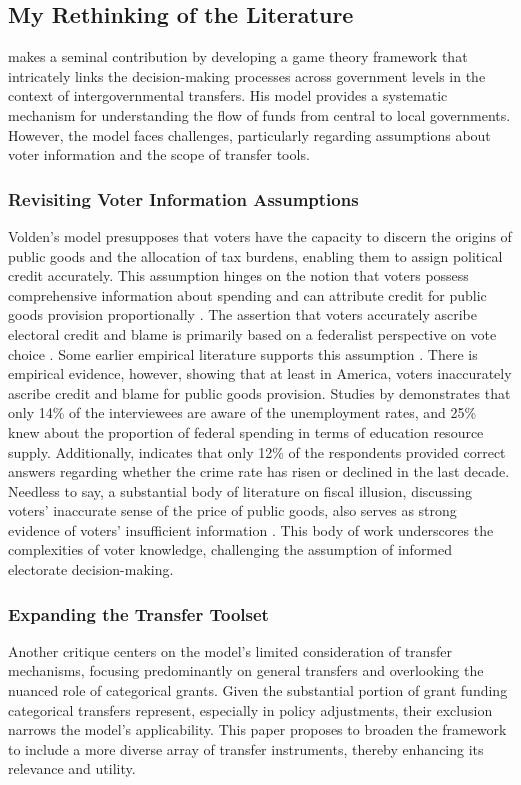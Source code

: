 \subsection{My Rethinking of the Literature}
\Textcite{volden2007intergovernmental} makes a seminal contribution by developing a game theory framework that intricately links the decision-making processes across government levels in the context of intergovernmental transfers. His model provides a systematic mechanism for understanding the flow of funds from central to local governments. However, the model faces challenges, particularly regarding assumptions about voter information and the scope of transfer tools.

\subsubsection{Revisiting Voter Information Assumptions}
Volden's model presupposes that voters have the capacity to discern the origins of public goods and the allocation of tax burdens, enabling them to assign political credit accurately. This assumption hinges on the notion that voters possess comprehensive information about spending and can attribute credit for public goods provision proportionally \parencite{volden2005intergovernmental}. The assertion that voters accurately ascribe electoral credit and blame is primarily based on a federalist perspective on vote choice \parencite{stein1990economic}. Some earlier empirical literature supports this assumption \parencite{atkeson1995economic}. There is empirical evidence, however, showing that at least in America, voters inaccurately ascribe credit and blame for public goods provision. Studies by \Textcite{carpini1996americans} demonstrates that only 14\% of the interviewees are aware of the unemployment rates, and 25\% knew about the proportion of federal spending in terms of education resource supply. Additionally, \Textcite{gilens2001political} indicates that only 12\% of the respondents provided correct answers regarding whether the crime rate has risen or declined in the last decade. Needless to say, a substantial body of literature on fiscal illusion, discussing voters' inaccurate sense of the price of public goods, also serves as strong evidence of voters' insufficient information \parencite{oates1979lump,borge1995lump,turnbull1998overspending}. This body of work underscores the complexities of voter knowledge, challenging the assumption of informed electorate decision-making.

\subsubsection{Expanding the Transfer Toolset}
Another critique centers on the model's limited consideration of transfer mechanisms, focusing predominantly on general transfers and overlooking the nuanced role of categorical grants. Given the substantial portion of grant funding categorical transfers represent, especially in policy adjustments, their exclusion narrows the model's applicability. This paper proposes to broaden the framework to include a more diverse array of transfer instruments, thereby enhancing its relevance and utility.

